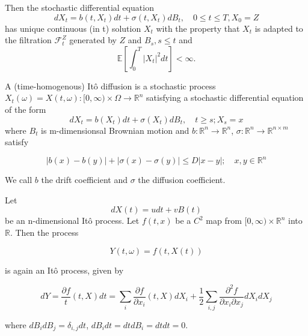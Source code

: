 \documentclass{beamer}
\begin{document}
\begin{frame}
\begin{theorem}
	Then the stochastic differential equation 
	\begin{equation}
		dX_t = b(t, X_t)dt + \sigma(t, X_t)dB_t, \quad 0 \leq t \leq T, X_0 = Z
	\end{equation}
	has unique continuous (in t) solution $X_t$ with the property that $X_t$ is adapted to the filtration $\mathcal{F}_t^Z$ generated by $Z$ and $B_s, s \leq t$ and
	\begin{equation}
		\mathbb{E}\left[ \int_0^T |X_t|^2 dt\right] < \infty.
	\end{equation}
\end{theorem}
\end{frame}

\begin{frame}
\begin{definition}
	A (time-homogenous) Itô diffusion is a stochastic process $X_t(\omega) = X(t,\omega):[0,\infty) \times \Omega \to \mathbb{R}^n$ satisfying a stochastic differential equation of the form
	\begin{equation*}
		dX_t = b(X_t)dt + \sigma(X_t)dB_t, \quad t \geq s; X_s = x
	\end{equation*}
where $B_t$ is m-dimensionsal Brownian motion and $b:\mathbb{R}^n \to \mathbb{R}^n$, $\sigma:\mathbb{R}^n \to \mathbb{R}^{n \times m}$ satisfy

\begin{equation*}
	|b(x) - b(y)| + |\sigma(x) - \sigma(y)| \leq D|x-y|; \quad x,y \in \mathbb{R}^n
\end{equation*}

We call $b$ the drift coefficient and $\sigma$ the diffusion coefficient.
\end{definition}
\end{frame}

\begin{frame}
\begin{theorem}
	Let
	\begin{equation*}
		dX(t) = u dt + v B(t)
	\end{equation*}
	be an n-dimensional Itô process. Let $f(t, x)$ be a $C^2$ map from $[0,\infty) \times \mathbb{R}^n$ into $\mathbb{R}$. Then the process

	\begin{equation*}
		Y(t, \omega) = f(t, X(t))
	\end{equation*}

	is again an Itô process, given by

	\begin{equation*}
		dY = \frac{\partial f}{t}(t,X)dt = \sum_{i}\frac{\partial f}{\partial x_i}(t, X)dX_i + \frac{1}{2}\sum_{i,j}\frac{\partial^2f}{\partial x_i \partial x_j} dX_i dX_j
	\end{equation*}

	where $dB_i dB_j = \delta_{i,j}dt$, $dB_idt = dtdB_i = dtdt = 0$.
	
\end{theorem}
\end{frame}
\end{document}
